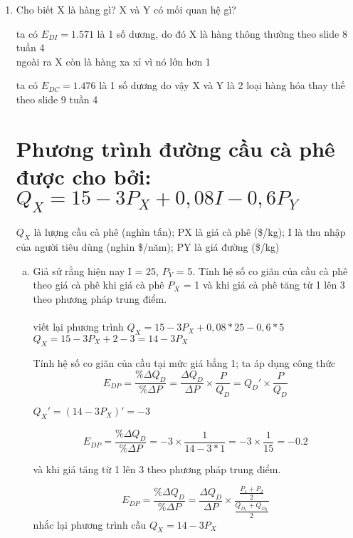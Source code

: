 \begin{enumerate}
  \item Cho biết X là hàng gì? X và Y có mối quan hệ gì?

        ta có $E_{DI} = 1.571$ là 1 số dương, do đó X là hàng thông thường theo slide 8 tuần 4 \\
        ngoài ra X còn là hàng xa xỉ vì nó lớn hơn 1

        ta có $E_{DC} = 1.476$ là 1 số dương do vậy X và Y là 2 loại hàng hóa thay thế theo slide 9 tuần 4 \\


        \section{Phương trình đường cầu cà phê được cho bởi: $Q_X = 15 - 3P_X + 0,08I - 0,6P_Y$}

        $Q_X$ là lượng cầu cà phê (nghìn tấn); PX là giá cà phê (\$/kg); I là thu nhập của người tiêu
        dùng (nghìn \$/năm); PY là giá đường (\$/kg)

        \begin{enumerate}[a.]
          \item Giả sử rằng hiện nay I = 25, $P_Y$ = 5.  Tính hệ số co giãn của cầu cà phê theo giá cà phê
                khi giá cà phê $P_X$ = 1 và khi giá cà phê tăng từ 1 lên 3 theo phương pháp trung điểm. \\ \\
                viết lại phương trình  $Q_X = 15 - 3P_X + 0,08 * 25 - 0,6 * 5$ \\
                $Q_X = 15 - 3P_X + 2 - 3 = 14 - 3P_X$

                Tính hệ số co giãn của cầu tại mức giá bẳng 1;
                ta áp dụng công thức
                \[ E_{DP} = \frac{\%\Delta Q_D}{\%\Delta P} =
                  \frac{\Delta Q_D}{\Delta P} \times \frac{P}{Q_D} = Q_D' \times \frac{P}{Q_D} \]

                $Q_X' = ( 14 - 3P_X)' = -3$

                \[ E_{DP} = \frac{\%\Delta Q_D}{\%\Delta P} = -3 \times \frac{1}{14 - 3 * 1}
                  = -3 \times \frac{1}{15} = -0.2 \]

                và khi giá tăng từ 1 lên 3 theo phương  pháp trung điểm.

                \[ E_{DP} = \frac{\%\Delta Q_D}{\%\Delta P} =
                  \frac{\Delta Q_D}{\Delta P}  \times
                  \frac{\frac{P_1 + P_2}{2}}{\frac{Q_{D_1} + Q_{D_2}}{2}}
                \]
                nhắc lại phương trình cầu $Q_X = 14 - 3P_X$


\end{enumerate}
\end{enumerate}
